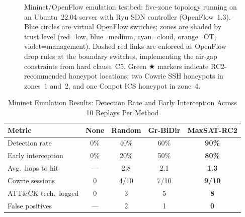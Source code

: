 \documentclass[journal]{IEEEtran}
\begin{document}
\begin{figure}[!t]
\caption{Mininet/OpenFlow emulation testbed: five-zone
         topology running on an Ubuntu~22.04 server with
         Ryu SDN controller (OpenFlow~1.3).
         Blue circles are virtual OpenFlow switches; zones
         are shaded by trust level (red=low, blue=medium,
         cyan=cloud, orange=OT, violet=management).
         Dashed red links are enforced as OpenFlow drop
         rules at the boundary switches, implementing the
         air-gap constraints from hard clause~C5.
         Green $\bigstar$ markers
         indicate RC2-recommended honeypot locations:
         two Cowrie SSH honeypots in zones~1 and~2,
         and one Conpot ICS honeypot in zone~4.}
\label{fig:mininet_topo}
\end{figure}

\begin{table}[htbp]
\caption{Mininet Emulation Results: Detection Rate and
         Early Interception Across 10 Replays Per Method}
\label{tab:mininet}
\centering\renewcommand{\arraystretch}{1.2}
\begin{tabular}{@{}lcccc@{}}
\toprule
\textbf{Metric}&\textbf{None}&\textbf{Random}&
\textbf{Gr-BiDir}&\textbf{MaxSAT-RC2}\\
\midrule
Detection rate&0\%&40\%&60\%&\textbf{90\%}\\
Early interception&0\%&20\%&50\%&\textbf{80\%}\\
Avg.\ hops to hit&---&2.8&2.1&\textbf{1.3}\\
Cowrie sessions&0&4/10&7/10&\textbf{9/10}\\
ATT\&CK tech.\ logged&0&3&5&\textbf{8}\\
False positives&---&2&1&\textbf{0}\\
\bottomrule
\end{tabular}
\end{table}
\end{document}
